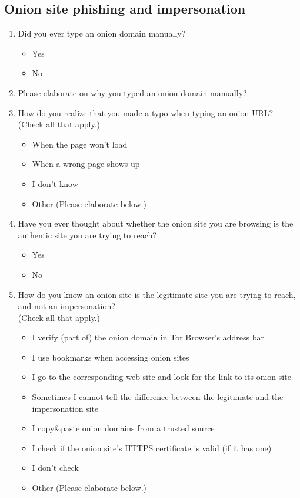 \subsection{Onion site phishing and impersonation}
\begin{enumerate}
    \item Did you ever type an onion domain manually?
        \begin{itemize}[label=$\Circle$]
            \item Yes
            \item No
        \end{itemize}

    \item Please elaborate on why you typed an onion domain manually?

    \item How do you realize that you made a typo when typing an onion
        URL?\\(Check all that apply.)
        \begin{itemize}[label=$\Square$]
            \item When the page won't load
            \item When a wrong page shows up
            \item I don't know
            \item Other (Please elaborate below.)
        \end{itemize}

    \item Have you ever thought about whether the onion site you are browsing
        is the authentic site you are trying to reach?
        \begin{itemize}[label=$\Circle$]
            \item Yes
            \item No
        \end{itemize}

    \item How do you know an onion site is the legitimate site you are trying
        to reach, and not an impersonation?\\(Check all that apply.)
        \begin{itemize}[label=$\Square$]
            \item I verify (part of) the onion domain in Tor Browser's address
                bar
            \item I use bookmarks when accessing onion sites
            \item I go to the corresponding web site and look for the link to
                its onion site
            \item Sometimes I cannot tell the difference between the legitimate
                and the impersonation site
            \item I copy\&paste onion domains from a trusted source
            \item I check if the onion site's HTTPS certificate is valid (if it
                has one)
            \item I don't check
            \item Other (Please elaborate below.)
        \end{itemize}


\end{enumerate}
